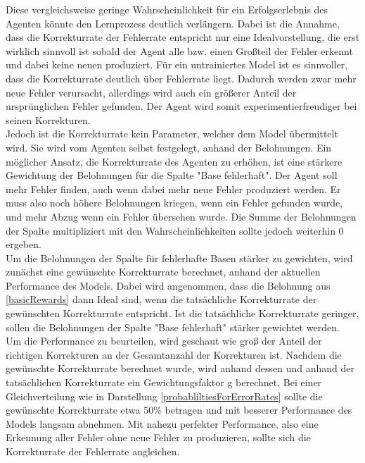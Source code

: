 \documentclass[oneside,bibliography=totocnumbered,BCOR=5mm]{scrbook}%
\theoremstyle{definition}
\theoremstyle{definition}
\theoremstyle{definition}
\theoremstyle{definition}
\theoremstyle{definition}
\theoremstyle{definition}
\begin{document}
Diese vergleichsweise geringe Wahrscheinlichkeit für ein Erfolgserlebnis des Agenten könnte den Lernprozess deutlich verlängern.
Dabei ist die Annahme, dass die Korrekturrate der Fehlerrate entspricht nur eine Idealvorstellung, die erst wirklich sinnvoll
ist sobald der Agent alle bzw. einen Großteil der Fehler erkennt und dabei keine neuen produziert.
Für ein untrainiertes Model ist es sinnvoller, dass die Korrekturrate deutlich über Fehlerrate liegt. 
Dadurch werden zwar mehr neue Fehler verursacht, allerdings wird auch ein größerer Anteil der ursprünglichen Fehler
gefunden. Der Agent wird somit experimentierfreudiger bei seinen Korrekturen.\\

Jedoch ist die Korrekturrate kein Parameter, welcher dem Model übermittelt wird.
Sie wird vom Agenten selbst festgelegt, anhand der Belohnungen. 
Ein möglicher Ansatz, die Korrekturrate des Agenten zu erhöhen, ist eine stärkere Gewichtung der Belohnungen für die Spalte "Base fehlerhaft".
Der Agent soll mehr Fehler finden, auch wenn dabei mehr neue Fehler produziert werden.
Er muss also noch höhere Belohnungen kriegen, wenn ein Fehler gefunden wurde,
und mehr Abzug wenn ein Fehler übersehen wurde. Die Summe der Belohnungen der Spalte 
multipliziert mit den Wahrscheinlichkeiten sollte jedoch weiterhin 0 ergeben. \\

Um die Belohnungen der Spalte für fehlerhafte Basen stärker zu gewichten, wird zunächst eine
gewünschte Korrekturrate berechnet, anhand der aktuellen Performance des Models.
Dabei wird angenommen, dass die Belohnung aus \ref{basicRewards} dann Ideal sind, 
wenn die tatsächliche Korrekturrate der gewünschten Korrekturrate entspricht.
Ist die tatsächliche Korrekturrate geringer, sollen die Belohnungen der Spalte "Base fehlerhaft"
stärker gewichtet werden. \\

Um die Performance zu beurteilen, wird geschaut wie groß der Anteil der richtigen Korrekturen
an der Gesamtanzahl der Korrekturen ist. Nachdem die gewünschte Korrekturrate berechnet wurde,
wird anhand dessen und anhand der tatsächlichen Korrekturrate ein Gewichtungsfaktor g berechnet.
Bei einer Gleichverteilung wie in Darstellung \ref{probabliltiesForErrorRates} sollte die gewünschte 
Korrekturrate etwa 50\% betragen und mit besserer Performance des Models langsam abnehmen. 
Mit nahezu perfekter Performance, also eine Erkennung aller Fehler ohne neue Fehler zu produzieren,
sollte sich die Korrekturrate der Fehlerrate angleichen.\\
\end{document}
